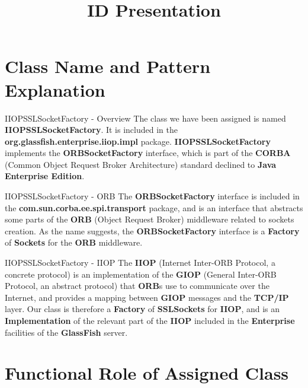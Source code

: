 \documentclass{../common/latex_classes/pdf_presentation}
\title{ID Presentation}
\begin{document}
	\titleToc{}
	\section{Class Name and Pattern Explanation}
	
	\begin{frame}{IIOPSSLSocketFactory - Overview}
		The class we have been assigned is named \textbf{IIOPSSLSocketFactory}.
		It is included in the \textbf{org.glassfish.enterprise.iiop.impl} package.
		\textbf{IIOPSSLSocketFactory} implements the \textbf{ORBSocketFactory} interface, which is part of the \textbf{CORBA} (Common Object Request Broker Architecture) standard declined to \textbf{Java Enterprise Edition}.
	\end{frame}
	
	\begin{frame}{IIOPSSLSocketFactory - ORB}
		The \textbf{ORBSocketFactory} interface is included in the \textbf{com.sun.corba.ee.spi.transport} package, and is an interface that abstracts some parts of the \textbf{ORB} (Object Request Broker) middleware related to sockets creation.
		As the name suggests, the \textbf{ORBSocketFactory} interface is a \textbf{Factory} of \textbf{Sockets} for the \textbf{ORB} middleware.
	\end{frame}
	
	\begin{frame}{IIOPSSLSocketFactory - IIOP}
		The \textbf{IIOP} (Internet Inter-ORB Protocol, a concrete protocol) is an implementation of the \textbf{GIOP} (General Inter-ORB Protocol, an abstract protocol) that \textbf{ORB}s use to communicate over the Internet, and provides a mapping between \textbf{GIOP} messages and the \textbf{TCP/IP} layer.
		Our class is therefore a \textbf{Factory} of \textbf{SSLSockets} for \textbf{IIOP}, and is an \textbf{Implementation} of the relevant part of the \textbf{IIOP} included in the \textbf{Enterprise} facilities of the \textbf{GlassFish} server.
	\end{frame}
	
	\section{Functional Role of Assigned Class}
	
\end{document}
